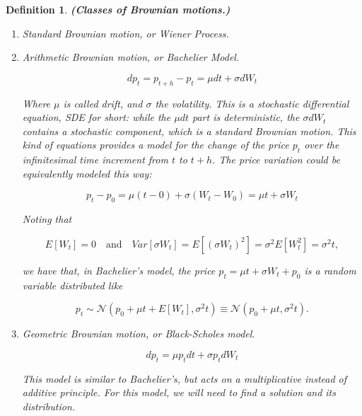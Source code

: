 \documentclass[oneside,titlepage,headinclude,12pt,a4paper,BCOR5mm,footinclude]{book}
\theoremstyle{defn}
\newtheorem{defn}{Definition}
\begin{document}

\begin{defn}\textbf{(Classes of Brownian motions.)}

\begin{enumerate}[label=(\Roman*)]
  \item \textit{Standard Brownian motion}, or \textit{Wiener Process}.
  \item \textit{Arithmetic Brownian motion}, or \textit{Bachelier Model}.
    
    \[
      dp_t = p_{t+h} - p_t = \mu dt + \sigma dW_t
    \]

    Where    $\mu$    is    called   \textit{drift},    and    $\sigma$    the
    \textit{volatility}. This is  a \textit{stochastic differential equation},
    \textit{SDE} for short: while the $\mu dt$ part is \textit{deterministic},
    the $\sigma  dW_t$ contains  a \textit{stochastic}  component, which  is a
    standard Brownian motion. This kind of  equations provides a model for the
    change of the  price $p_t$ over the infinitesimal time  increment from $t$
    to $t+h$. The price variation could be equivalently modeled this way:

    \[
      p_t - p_0 = \mu(t-0) + \sigma(W_t - W_0) = \mu t + \sigma W_t
    \]
    
    Noting that 

    \[ 
      E[W_t]  =  0
      \quad \text{and} \quad
      Var[\sigma W_t]  =  E[(\sigma W_t)^2]  = \sigma^2 E[W_t^2] =  \sigma^2 t,
    \]

    we have that, in Bachelier's model, the price  $p_t = \mu t + \sigma W_t +
    p_0$ is a \textit{random variable} distributed like

    \[
      p_t \sim \mathcal{N}(p_0 + \mu t + E[W_t], \sigma^2 t) \equiv
        \mathcal{N}(p_0 + \mu t, \sigma^2 t).
    \]

  \item \textit{Geometric Brownian motion}, or \textit{Black-Scholes model}.

    \[
      dp_t = \mu p_t dt + \sigma p_t dW_t
    \]

    This model is similar to Bachelier's, but acts on a multiplicative instead
    of additive principle. For this model, we will need to find a solution and
    its distribution.

\end{enumerate}
\end{defn}
\end{document}
